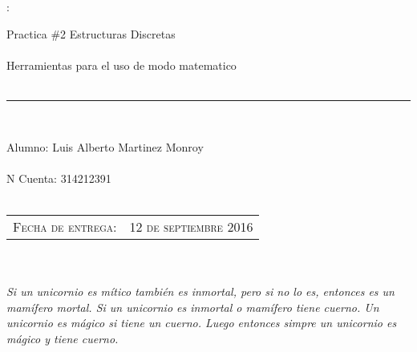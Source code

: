 \documentclass{report}%
\begin{document}
\parindent=0mm:

\thispagestyle{plain}%
               \titlehead%
                   {
                     Materia: Estructuras Discretas 2017-1\\
                     Profesora: Laura Freudberg Gojman\\
                     Universidad Nacional Autonoma De México\hfill
                     Facultad de ciencias\\
                     Alumno: Luis Alberto Martinez Monroy
                   }


\begin{center}%

{\Huge Practica \#2 Estructuras Discretas\\}\\%
{\Large Herramientas para el uso de modo matematico}\\\\%
\hrule\\%

\end{center}
\vspace{.3cm} %
\begin{center}%
Alumno: Luis Alberto Martinez Monroy\\\\%
N Cuenta: 314212391\\\\%

\begin{tabular}{cc}%
                       \textsc{Fecha de entrega:}& \textsc{12 de septiembre 2016}\\
                   \end{tabular}

\end{center}%
\\%
\\
{\small \it Si un unicornio es mítico también es inmortal, pero si no lo es, entonces es un
mamífero mortal. Si un unicornio es inmortal o mamífero tiene cuerno. Un unicornio
es mágico si tiene un cuerno. Luego entonces simpre un unicornio es mágico y tiene
cuerno.}\\
\end{document}
